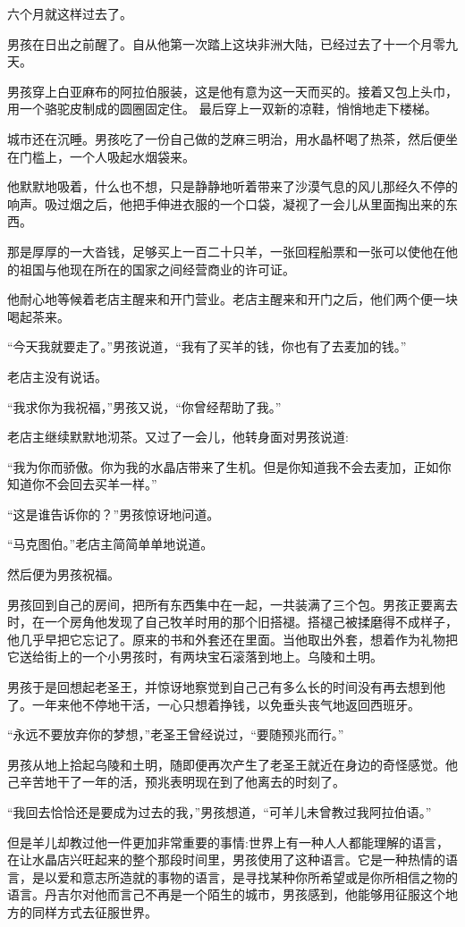 \documentclass[twoside,openany]{book}
\begin{document}
六个月就这样过去了。

男孩在日出之前醒了。自从他第一次踏上这块非洲大陆，已经过去了十一个月零九天。

男孩穿上白亚麻布的阿拉伯服装，这是他有意为这一天而买的。接着又包上头巾，用一个骆驼皮制成的圆圈固定住。 最后穿上一双新的凉鞋，悄悄地走下楼梯。

城市还在沉睡。男孩吃了一份自己做的芝麻三明治，用水晶杯喝了热茶，然后便坐在门槛上，一个人吸起水烟袋来。

他默默地吸着，什么也不想，只是静静地听着带来了沙漠气息的风儿那经久不停的响声。吸过烟之后，他把手伸进衣服的一个口袋，凝视了一会儿从里面掏出来的东西。

那是厚厚的一大沓钱，足够买上一百二十只羊，一张回程船票和一张可以使他在他的祖国与他现在所在的国家之间经营商业的许可证。

他耐心地等候着老店主醒来和开门营业。老店主醒来和开门之后，他们两个便一块喝起茶来。

“今天我就要走了。”男孩说道，“我有了买羊的钱，你也有了去麦加的钱。”

老店主没有说话。

“我求你为我祝福，”男孩又说，“你曾经帮助了我。”

老店主继续默默地沏茶。又过了一会儿，他转身面对男孩说道:

“我为你而骄傲。你为我的水晶店带来了生机。但是你知道我不会去麦加，正如你知道你不会回去买羊一样。”

“这是谁告诉你的？”男孩惊讶地问道。

“马克图伯。”老店主简简单单地说道。

然后便为男孩祝福。

男孩回到自己的房间，把所有东西集中在一起，一共装满了三个包。男孩正要离去时，在一个房角他发现了自己牧羊时用的那个旧搭褪。搭褪己被揉磨得不成样子，他几乎早把它忘记了。原来的书和外套还在里面。当他取出外套，想着作为礼物把它送给街上的一个小男孩时，有两块宝石滚落到地上。乌陵和土明。

男孩于是回想起老圣王，并惊讶地察觉到自己己有多么长的时间没有再去想到他了。一年来他不停地干活，一心只想着挣钱，以免垂头丧气地返回西班牙。

“永远不要放弃你的梦想，”老圣王曾经说过，“要随预兆而行。”

男孩从地上拾起乌陵和土明，随即便再次产生了老圣王就近在身边的奇怪感觉。他己辛苦地干了一年的活，预兆表明现在到了他离去的时刻了。

“我回去恰恰还是要成为过去的我，”男孩想道，“可羊儿未曾教过我阿拉伯语。”

但是羊儿却教过他一件更加非常重要的事情:世界上有一种人人都能理解的语言，在让水晶店兴旺起来的整个那段时间里，男孩使用了这种语言。它是一种热情的语言，是以爱和意志所造就的事物的语言，是寻找某种你所希望或是你所相信之物的语言。丹吉尔对他而言己不再是一个陌生的城市，男孩感到，他能够用征服这个地方的同样方式去征服世界。
\end{document}
